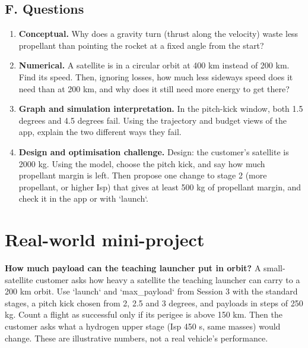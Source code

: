 \documentclass[11pt,a4paper]{article}
\begin{document}
\subsection*{F. Questions}
\begin{enumerate}[nosep]
\item \textbf{Conceptual.} Why does a gravity turn (thrust along the velocity) waste less propellant than pointing the rocket at a fixed angle from the start?
\item \textbf{Numerical.} A satellite is in a circular orbit at 400 km instead of 200 km. Find its speed. Then, ignoring losses, how much less sideways speed does it need than at 200 km, and why does it still need more energy to get there?
\item \textbf{Graph and simulation interpretation.} In the pitch-kick window, both 1.5 degrees and 4.5 degrees fail. Using the trajectory and budget views of the app, explain the two different ways they fail.
\item \textbf{Design and optimisation challenge.} Design: the customer's satellite is 2000 kg. Using the model, choose the pitch kick, and say how much propellant margin is left. Then propose one change to stage 2 (more propellant, or higher Isp) that gives at least 500 kg of propellant margin, and check it in the app or with `launch`.
\end{enumerate}

\section{Real-world mini-project}
\textbf{How much payload can the teaching launcher put in orbit?} A small-satellite customer asks how heavy a satellite the teaching launcher can carry to a 200 km orbit. Use `launch` and `max\_payload` from Session 3 with the standard stages, a pitch kick chosen from 2, 2.5 and 3 degrees, and payloads in steps of 250 kg. Count a flight as successful only if its perigee is above 150 km. Then the customer asks what a hydrogen upper stage (Isp 450 s, same masses) would change. These are illustrative numbers, not a real vehicle's performance.
\end{document}
